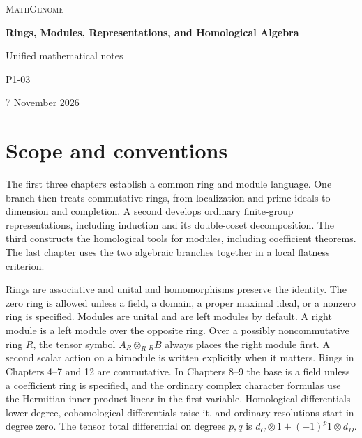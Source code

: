\documentclass[11pt,oneside,openany]{book}
\theoremstyle{definition}
\theoremstyle{remark}
\begin{document}
\frontmatter
\hypersetup{pageanchor=false}
\begin{titlepage}
\centering
\vspace*{0.17\textheight}
{\large\scshape MathGenome\par}
\vspace{2em}
{\Huge\bfseries Rings, Modules, Representations, and Homological Algebra\par}
\vspace{1.8em}
{\Large Unified mathematical notes\par}
\vfill
{\large P1-03\par}
\vspace{0.5em}
{7 November 2026\par}
\end{titlepage}
\hypersetup{pageanchor=true}

\chapter*{Scope and conventions}

The first three chapters establish a common ring and module language. One branch then treats commutative rings, from localization and prime ideals to dimension and completion. A second develops ordinary finite-group representations, including induction and its double-coset decomposition. The third constructs the homological tools for modules, including coefficient theorems. The last chapter uses the two algebraic branches together in a local flatness criterion.

Rings are associative and unital and homomorphisms preserve the identity. The zero ring is allowed unless a field, a domain, a proper maximal ideal, or a nonzero ring is specified. Modules are unital and are left modules by default. A right module is a left module over the opposite ring. Over a possibly noncommutative ring \(R\), the tensor symbol \(A_R\otimes_R {}_RB\) always places the right module first. A second scalar action on a bimodule is written explicitly when it matters. Rings in Chapters 4--7 and 12 are commutative. In Chapters 8--9 the base is a field unless a coefficient ring is specified, and the ordinary complex character formulas use the Hermitian inner product linear in the first variable. Homological differentials lower degree, cohomological differentials raise it, and ordinary resolutions start in degree zero. The tensor total differential on degrees \(p,q\) is \(d_C\otimes 1+(-1)^p 1\otimes d_D\).
\end{document}
